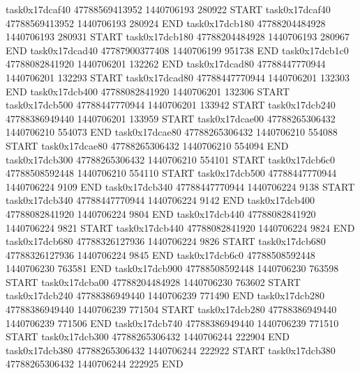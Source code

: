 task0x17dcaf40 47788569413952          1440706193               280922  START
task0x17dcaf40 47788569413952          1440706193               280924  END
task0x17dcb180 47788204484928          1440706193               280931  START
task0x17dcb180 47788204484928          1440706193               280967  END
task0x17dcad40 47787900377408          1440706199               951738  END
task0x17dcb1c0 47788082841920          1440706201               132262  END
task0x17dcad80 47788447770944          1440706201               132293  START
task0x17dcad80 47788447770944          1440706201               132303  END
task0x17dcb400 47788082841920          1440706201               132306  START
task0x17dcb500 47788447770944          1440706201               133942  START
task0x17dcb240 47788386949440          1440706201               133959  START
task0x17dcae00 47788265306432          1440706210               554073  END
task0x17dcae80 47788265306432          1440706210               554088  START
task0x17dcae80 47788265306432          1440706210               554094  END
task0x17dcb300 47788265306432          1440706210               554101  START
task0x17dcb6c0 47788508592448          1440706210               554110  START
task0x17dcb500 47788447770944          1440706224                 9109  END
task0x17dcb340 47788447770944          1440706224                 9138  START
task0x17dcb340 47788447770944          1440706224                 9142  END
task0x17dcb400 47788082841920          1440706224                 9804  END
task0x17dcb440 47788082841920          1440706224                 9821  START
task0x17dcb440 47788082841920          1440706224                 9824  END
task0x17dcb680 47788326127936          1440706224                 9826  START
task0x17dcb680 47788326127936          1440706224                 9845  END
task0x17dcb6c0 47788508592448          1440706230               763581  END
task0x17dcb900 47788508592448          1440706230               763598  START
task0x17dcba00 47788204484928          1440706230               763602  START
task0x17dcb240 47788386949440          1440706239               771490  END
task0x17dcb280 47788386949440          1440706239               771504  START
task0x17dcb280 47788386949440          1440706239               771506  END
task0x17dcb740 47788386949440          1440706239               771510  START
task0x17dcb300 47788265306432          1440706244               222904  END
task0x17dcb380 47788265306432          1440706244               222922  START
task0x17dcb380 47788265306432          1440706244               222925  END
